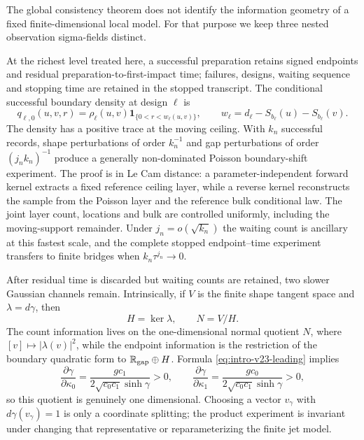 The global consistency theorem does not identify the information geometry of
a fixed finite-dimensional local model.  For that purpose we keep three
nested observation sigma-fields distinct.

At the richest level treated here, a successful preparation retains signed
endpoints and residual preparation-to-first-impact time; failures, designs,
waiting sequence and stopping time are retained in the stopped transcript.
The conditional successful boundary density at design \(\ell\) is
\begin{equation}\label{eq:intro-et-density}
 q_{\ell,0}(u,v,r)=
 \rho_\ell(u,v)\mathbf1_{\{0<r<w_\ell(u,v)\}},
 \qquad
 w_\ell=d_\ell-S_{b_\ell}(u)-S_{b_\ell}(v).
\end{equation}
The density has a positive trace at the moving ceiling.  With \(k_n\)
successful records, shape perturbations of order \(k_n^{-1}\) and gap
perturbations of order \((j_nk_n)^{-1}\) produce a generally non-dominated
Poisson boundary-shift experiment.  The proof is in Le Cam distance: a
parameter-independent forward kernel extracts a fixed reference ceiling
layer, while a reverse kernel reconstructs the sample from the Poisson layer
and the reference bulk conditional law.  The joint layer count, locations and
bulk are controlled uniformly, including the moving-support remainder.
Under \(j_n=o(\sqrt{k_n})\) the waiting count is ancillary at this fastest
scale, and the complete stopped endpoint--time experiment transfers to
finite bridges when \(k_n\tau^{j_n}\to0\).

After residual time is discarded but waiting counts are retained, two slower
Gaussian channels remain.  Intrinsically, if \(V\) is the finite shape
tangent space and \(\lambda=d\gamma\), then
\[
                         H=\ker\lambda,
 \qquad N=V/H.
\]
The count information lives on the one-dimensional normal quotient \(N\),
where \([v]\mapsto|\lambda(v)|^2\), while the endpoint information is the
restriction of the boundary quadratic form to
\(\mathbb R_{\rm gap}\oplus H\).  Formula
\eqref{eq:intro-v23-leading} implies
\[
 \frac{\partial\gamma}{\partial\kappa_0}
 =\frac{gc_1}{2\sqrt{c_0c_1}\sinh\gamma}>0,
 \qquad
 \frac{\partial\gamma}{\partial\kappa_1}
 =\frac{gc_0}{2\sqrt{c_0c_1}\sinh\gamma}>0,
\]
so this quotient is genuinely one dimensional.  Choosing a vector
\(v_\gamma\) with \(d\gamma(v_\gamma)=1\) is only a coordinate splitting; the
product experiment is invariant under changing that representative or
reparameterizing the finite jet model.

